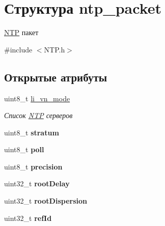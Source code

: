 \hypertarget{structntp__packet}{}\section{Структура ntp\+\_\+packet}
\label{structntp__packet}


\mbox{\hyperlink{classNTP}{N\+TP}} пакет  




{\ttfamily \#include $<$N\+T\+P.\+h$>$}

\subsection*{Открытые атрибуты}
\begin{DoxyCompactItemize}
\item 
\mbox{\label{structntp__packet_ab9adbefc25f3b23104483c1d4dd1f489}} 
uint8\+\_\+t \mbox{\hyperlink{structntp__packet_ab9adbefc25f3b23104483c1d4dd1f489}{li\+\_\+vn\+\_\+mode}}
\begin{DoxyCompactList}\small\item\em Список \mbox{\hyperlink{classNTP}{N\+TP}} серверов \end{DoxyCompactList}\item 
\mbox{\label{structntp__packet_aa5ee6391aab0519b005cecd1369978a7}} 
uint8\+\_\+t {\bfseries stratum}
\item 
\mbox{\label{structntp__packet_a7d63926eabb30046753a30e34b1840a7}} 
uint8\+\_\+t {\bfseries poll}
\item 
\mbox{\label{structntp__packet_aa438368f1f6eb68ce100be6f6bb2d623}} 
uint8\+\_\+t {\bfseries precision}
\item 
\mbox{\label{structntp__packet_ae77481785174459f9fa4213304f6a933}} 
uint32\+\_\+t {\bfseries root\+Delay}
\item 
\mbox{\label{structntp__packet_a376f135ccdf41e3eb9eff55961c22fe3}} 
uint32\+\_\+t {\bfseries root\+Dispersion}
\item 
\mbox{\label{structntp__packet_a8360c7445ef179ab1144d4b236cb152a}} 
uint32\+\_\+t {\bfseries ref\+Id}

\end{DoxyCompactItemize}
